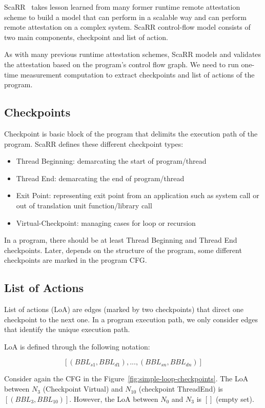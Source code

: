 ScaRR~\cite{toffaliniScaRRScalableRuntime2019} takes lesson learned from many
former runtime remote attestation scheme to build a model that can perform in a
scalable way and can perform remote attestation on a complex system. ScaRR
control-flow model consists of two main components, checkpoint and list of
action. 

As with many previous runtime attestation schemes, ScaRR models and validates
the attestation based on the program's control flow graph. We need to run
one-time measurement computation to extract checkpoints and list of actions of
the program.

\subsection{Checkpoints} \label{sec:scarr-checkpoints} Checkpoint is basic block
of the program that delimits the execution path of the program. ScaRR defines
these different checkpoint types:
\begin{itemize}
    \item Thread Beginning: demarcating the start of program/thread
    \item Thread End: demarcating the end of program/thread
    \item Exit Point: representing exit point from an application such as system
    call or out of translation unit function/library call
    \item Virtual-Checkpoint: managing cases for loop or recursion
\end{itemize}

In a program, there should be at least Thread Beginning and Thread End
checkpoints. Later, depends on the structure of the program, some different
checkpoints are marked in the program CFG.

\subsection{List of Actions}

List of actions (LoA) are edges (marked by two checkpoints) that direct one
checkpoint to the next one. In a program execution path, we only consider edges
that identify the unique execution path.

LoA is defined through the following notation:


$$[(BBL_{s1},BBL_{d1}),...,(BBL_{sn},BBL_{dn})]$$

Consider again the CFG in the Figure~\ref{fig:simple-loop-checkpoints}. The LoA
between $N_3$ (Checkpoint Virtual) and $N_{10}$ (checkpoint ThreadEnd) is
$[(BBL_3, BBL_{10})]$. However, the LoA between $N_0$ and $N_3$ is $[]$ (empty
set).

